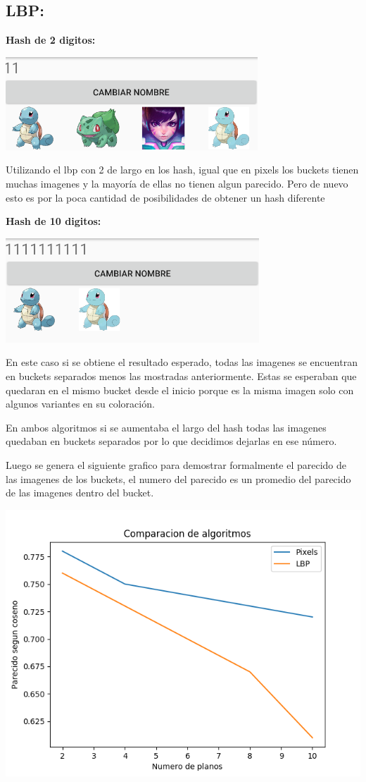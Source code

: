 \documentclass[12pt,twocolumn,letterpaper]{article}
\begin{document}
\subsection{\textbf{LBP:}}

\textbf{Hash de 2 digitos:}

\includegraphics{lbp2}

Utilizando el lbp con 2 de largo en los hash, igual que en pixels los buckets tienen muchas imagenes y la mayor\'ia de ellas no tienen algun parecido. Pero de nuevo esto es por la poca cantidad de posibilidades de obtener un hash diferente

\textbf{Hash de 10 digitos:}

\includegraphics{lbp10}

En este caso si se obtiene el resultado esperado, todas las imagenes se encuentran en buckets separados menos las mostradas anteriormente. Estas se esperaban que quedaran en el mismo bucket desde el inicio porque es la misma imagen solo con algunos variantes en su coloraci\'on.

En ambos algoritmos si se aumentaba el largo del hash todas las imagenes quedaban en buckets separados por lo que decidimos dejarlas en ese n\'umero.

Luego se genera el siguiente grafico para demostrar formalmente el parecido de las imagenes de los buckets, el numero del parecido es un promedio del parecido de las imagenes dentro del bucket.

\includegraphics[scale = 0.5]{comparacion}
\end{document}
